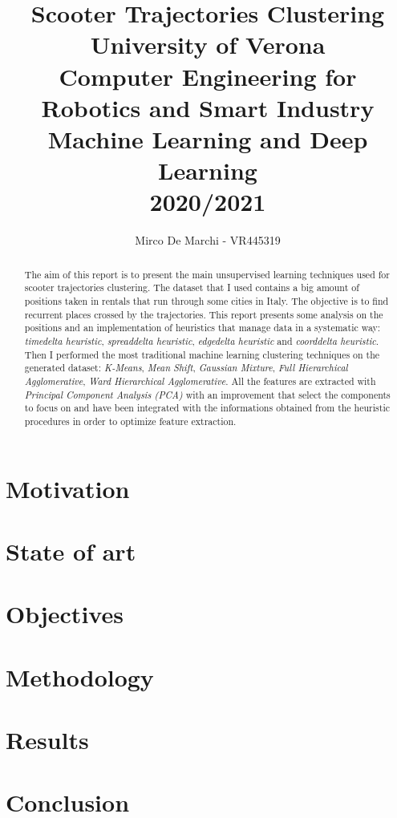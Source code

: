 \documentclass[]{IEEEtran}
\title{Scooter Trajectories Clustering\\
	{\large University of Verona\\Computer Engineering for Robotics and Smart Industry\\Machine Learning and Deep Learning\\2020/2021\\}}
\author{Mirco De Marchi - VR445319}
\begin{document}
\maketitle

\begin{abstract}
	The aim of this report is to present the main unsupervised learning techniques used for scooter trajectories clustering. The dataset that I used contains a big amount of positions taken in rentals that run through some cities in Italy. The objective is to find recurrent places crossed by the trajectories. This report presents some analysis on the positions and an implementation of heuristics that manage data in a systematic way: \textit{timedelta heuristic}, \textit{spreaddelta heuristic}, \textit{edgedelta heuristic} and \textit{coorddelta heuristic}. Then I performed the most traditional machine learning clustering techniques on the generated dataset: \textit{K-Means}, \textit{Mean Shift}, \textit{Gaussian Mixture}, \textit{Full Hierarchical Agglomerative}, \textit{Ward Hierarchical Agglomerative}. All the features are extracted with \textit{Principal Component Analysis (PCA)} with an improvement that select the components to focus on and have been integrated with the informations obtained from the heuristic procedures in order to optimize feature extraction.
\end{abstract}

\section{Motivation}


\section{State of art}


\section{Objectives}


\section{Methodology}


\section{Results}


\section{Conclusion}




\end{document}
